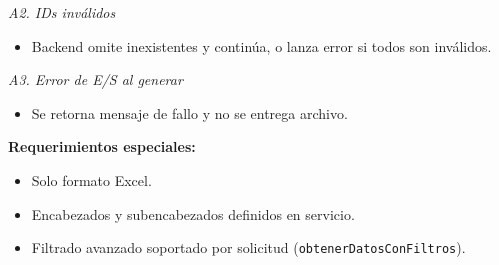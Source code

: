 \vspace{0.3em}
\noindent\textit{A2. IDs inválidos}
\begin{itemize}[nosep]
    \item Backend omite inexistentes y continúa, o lanza error si todos son inválidos.
\end{itemize}

\vspace{0.3em}
\noindent\textit{A3. Error de E/S al generar}
\begin{itemize}[nosep]
    \item Se retorna mensaje de fallo y no se entrega archivo.
\end{itemize}

\vspace{0.5em}
\noindent\textbf{Requerimientos especiales:}
\begin{itemize}[nosep]
    \item Solo formato Excel.
    \item Encabezados y subencabezados definidos en servicio.
    \item Filtrado avanzado soportado por solicitud (\texttt{obtenerDatosConFiltros}).
\end{itemize}
